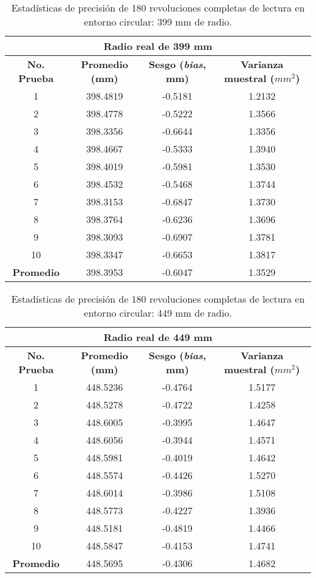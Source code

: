 \begin{table}[H]
	\centering
	\begin{tabular}{|c|c|c|c|}
		\hline
		\multicolumn{4}{|c|}{\textbf{Radio real de 399 mm}} \\ \hline
		\textbf{No. Prueba} & \textbf{Promedio (mm)} & \textbf{Sesgo (\textit{bias}, mm)} & \textbf{Varianza muestral ($mm^2$)} \\ \hline
		1 & 398.4819 & -0.5181 & 1.2132 \\ 
		2 & 398.4778 & -0.5222 & 1.3566 \\ 
		3 & 398.3356 & -0.6644 & 1.3356 \\ 
		4 & 398.4667 & -0.5333 & 1.3940 \\ 
		5 & 398.4019 & -0.5981 & 1.3530 \\ 
		6 & 398.4532 & -0.5468 & 1.3744 \\ 
		7 & 398.3153 & -0.6847 & 1.3730 \\ 
		8 & 398.3764 & -0.6236 & 1.3696 \\ 
		9 & 398.3093 & -0.6907 & 1.3781 \\ 
		10 & 398.3347 & -0.6653 & 1.3817 \\ \hline
		\textbf{Promedio} & 398.3953 & -0.6047 & 1.3529 \\ \hline
	\end{tabular}
	\caption{Estadísticas de precisión de 180 revoluciones completas de lectura en entorno circular: 399 mm de radio.}
	\label{fig:tabla_dists6}
\end{table}

\begin{table}[H]
	\centering
	\begin{tabular}{|c|c|c|c|}
		\hline
		\multicolumn{4}{|c|}{\textbf{Radio real de 449 mm}} \\ \hline
		\textbf{No. Prueba} & \textbf{Promedio (mm)} & \textbf{Sesgo (\textit{bias}, mm)} & \textbf{Varianza muestral ($mm^2$)} \\ \hline
		1 & 448.5236 & -0.4764 & 1.5177 \\ 
		2 & 448.5278 & -0.4722 & 1.4258 \\ 
		3 & 448.6005 & -0.3995 & 1.4647 \\ 
		4 & 448.6056 & -0.3944 & 1.4571 \\ 
		5 & 448.5981 & -0.4019 & 1.4642 \\ 
		6 & 448.5574 & -0.4426 & 1.5270 \\ 
		7 & 448.6014 & -0.3986 & 1.5108 \\ 
		8 & 448.5773 & -0.4227 & 1.3936 \\ 
		9 & 448.5181 & -0.4819 & 1.4466 \\
		10 & 448.5847 & -0.4153 & 1.4741 \\ \hline
		\textbf{Promedio} & 448.5695 & -0.4306 & 1.4682 \\ \hline
	\end{tabular}
	\caption{Estadísticas de precisión de 180 revoluciones completas de lectura en entorno circular: 449 mm de radio.}
	\label{fig:tabla_dists7}
\end{table}

